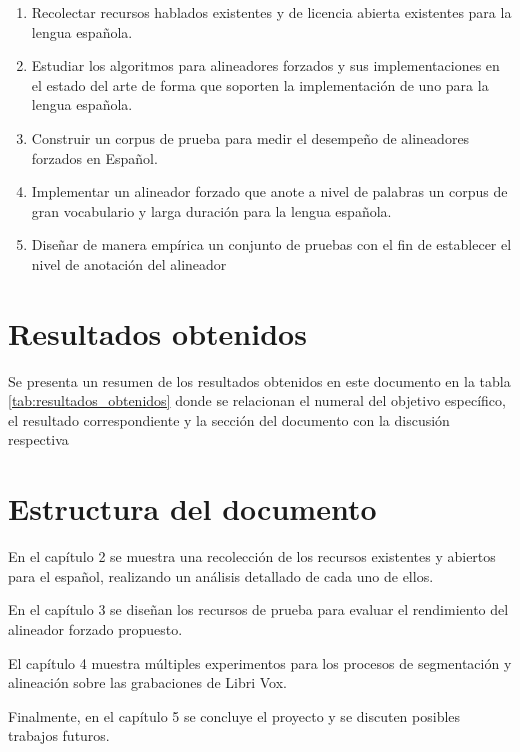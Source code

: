 \begin{enumerate}
    \item Recolectar recursos hablados existentes y de licencia abierta existentes para la lengua española.
    \item Estudiar los algoritmos para alineadores forzados y sus implementaciones en el estado del arte de forma que soporten la implementación de uno para la lengua española.
    \item Construir un corpus de prueba para medir el desempeño de alineadores forzados en Español.
    \item Implementar un alineador forzado que anote a nivel de palabras un corpus de gran vocabulario y larga duración para la lengua española.
    \item Diseñar de manera empírica un conjunto de pruebas con el fin de establecer el nivel de anotación del alineador

\end{enumerate}

\section{Resultados obtenidos}

Se presenta un resumen de los resultados obtenidos en este documento en la tabla
\ref{tab:resultados_obtenidos} donde se relacionan el numeral del objetivo específico, el resultado correspondiente y la sección del documento con la discusión respectiva



\section{Estructura del documento}

En el capítulo 2 se muestra una recolección de los recursos existentes y abiertos para el español, realizando un análisis detallado de cada uno de ellos.

En el capítulo 3 se diseñan los recursos de prueba para evaluar el rendimiento del alineador forzado propuesto.

El capítulo 4 muestra múltiples experimentos para los procesos de segmentación y alineación sobre las grabaciones de Libri Vox.

Finalmente, en el capítulo 5 se concluye el proyecto y se discuten posibles trabajos futuros.